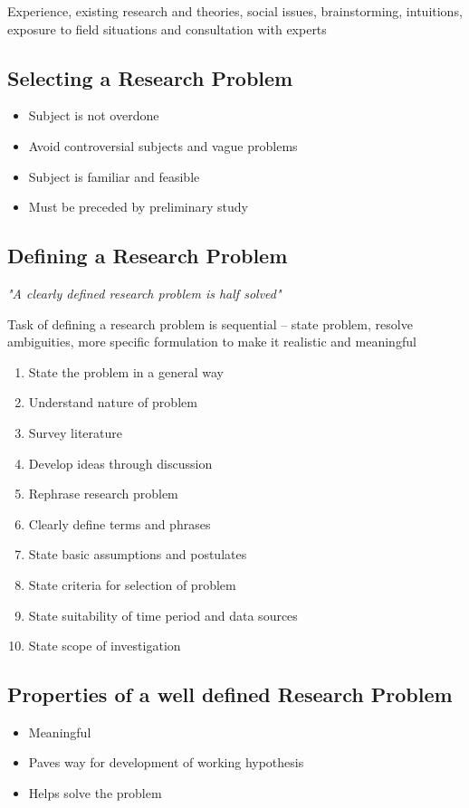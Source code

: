 \documentclass{article}
\begin{document}
Experience, existing research and theories, social issues, brainstorming, intuitions, exposure to field situations and consultation with experts

\subsection{Selecting a Research Problem}

\begin{itemize}
    \item Subject is not overdone
    \item Avoid controversial subjects and vague problems
    \item Subject is familiar and feasible
    \item Must be preceded by preliminary study
\end{itemize}

\subsection{Defining a Research Problem}

\textit{"A clearly defined research problem is half solved"}

Task of defining a research problem is sequential -- state problem, resolve ambiguities, more specific formulation to make it realistic and meaningful

\begin{enumerate}
    \item State the problem in a general way
    \item Understand nature of problem
    \item Survey literature
    \item Develop ideas through discussion
    \item Rephrase research problem
    \item Clearly define terms and phrases
    \item State basic assumptions and postulates
    \item State criteria for selection of problem
    \item State suitability of time period and data sources
    \item State scope of investigation
\end{enumerate}

\subsection{Properties of a well defined Research Problem}

\begin{itemize}
    \item Meaningful
    \item Paves way for development of working hypothesis
    \item Helps solve the problem
\end{itemize}
\end{document}
